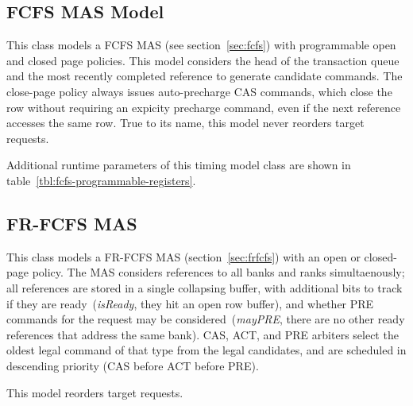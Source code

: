 \subsection{FCFS MAS Model}

This class models a FCFS MAS (see section~\ref{sec:fcfs}) with
programmable open and closed page policies. This model considers the head of
the transaction queue and the most recently completed reference to generate
candidate commands.  The close-page policy always issues auto-precharge CAS
commands, which close the row without requiring an expicity precharge command,
even if the next reference accesses the same row.  True to its name, this model
never reorders target requests.

\noindent Additional runtime parameters of this timing model class are shown in
table~\ref{tbl:fcfs-programmable-registers}.

\begin{table}[htb]
\begin{center}
\end{center}
\caption{Programmable registers of the FCFS MAS model.}
\label{tbl:fcfs-programmable-registers}
\end{table}%

\subsection{FR-FCFS MAS} This class models a FR-FCFS MAS
(section~\ref{sec:frfcfs}) with an open or closed-page policy. The MAS considers
references to all banks and ranks simultaenously; all references are stored in
a single collapsing buffer, with additional bits to track if they are
ready~(\emph{isReady}, they hit an open row buffer), and whether PRE
commands for the request may be considered~(\emph{mayPRE}, there are no other
ready references that address the same bank). CAS, ACT, and PRE arbiters select
the oldest legal command of that type from the legal candidates, and are
scheduled in descending priority (CAS before ACT before PRE).

This model reorders target requests.

